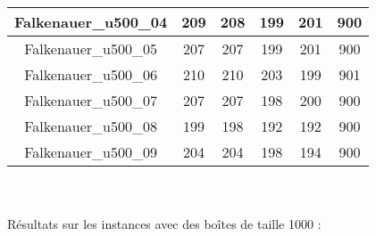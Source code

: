 \documentclass{article}
\begin{document}
\begin{tabular} {|c|c|c|c|c|c|}
    Falkenauer\_u500\_04 & 209 & 208 & 199 & 201 & 900 \\ \hline
    Falkenauer\_u500\_05 & 207 & 207 & 199 & 201 & 900 \\ \hline
    Falkenauer\_u500\_06 & 210 & 210 & 203 & 199 & 901 \\ \hline
    Falkenauer\_u500\_07 & 207 & 207 & 198 & 200 & 900 \\ \hline
    Falkenauer\_u500\_08 & 199 & 198 & 192 & 192 & 900 \\ \hline
    Falkenauer\_u500\_09 & 204 & 204 & 198 & 194 & 900 \\ \hline
\end{tabular}\\ \\

Résultats sur les instances avec des boîtes de taille 1000 :\\
\end{document}

